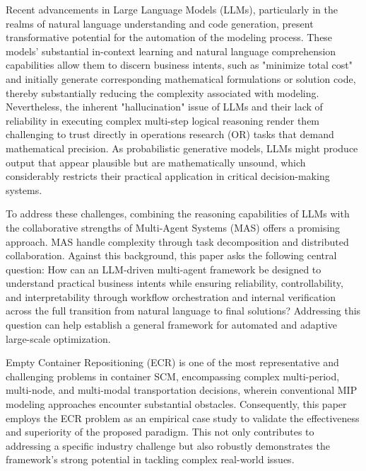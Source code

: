 \documentclass[preprint,12pt]{elsarticle}
\begin{document}
Recent advancements in Large Language Models (LLMs), particularly in the realms of natural language understanding and code generation, present transformative potential for the automation of the modeling process. These models' substantial in-context learning and natural language comprehension capabilities allow them to discern business intents, such as "minimize total cost" and initially generate corresponding mathematical formulations or solution code, thereby substantially reducing the complexity associated with modeling. Nevertheless, the inherent "hallucination" issue of LLMs and their lack of reliability in executing complex multi-step logical reasoning render them challenging to trust directly in operations research (OR) tasks that demand mathematical precision. As probabilistic generative models, LLMs might produce output that appear plausible but are mathematically unsound, which considerably restricts their practical application in critical decision-making systems.

To address these challenges, combining the reasoning capabilities of LLMs with the collaborative strengths of Multi-Agent Systems (MAS) offers a promising approach. MAS handle complexity through task decomposition and distributed collaboration. Against this background, this paper asks the following central question: How can an LLM-driven multi-agent framework be designed to understand practical business intents while ensuring reliability, controllability, and interpretability through workflow orchestration and internal verification across the full transition from natural language to final solutions? Addressing this question can help establish a general framework for automated and adaptive large-scale optimization.

Empty Container Repositioning (ECR) is one of the most representative and challenging problems in container SCM, encompassing complex multi-period, multi-node, and multi-modal transportation decisions, wherein conventional MIP modeling approaches encounter substantial obstacles. Consequently, this paper employs the ECR problem as an empirical case study to validate the effectiveness and superiority of the proposed paradigm. This not only contributes to addressing a specific industry challenge but also robustly demonstrates the framework's strong potential in tackling complex real-world issues.
\end{document}
